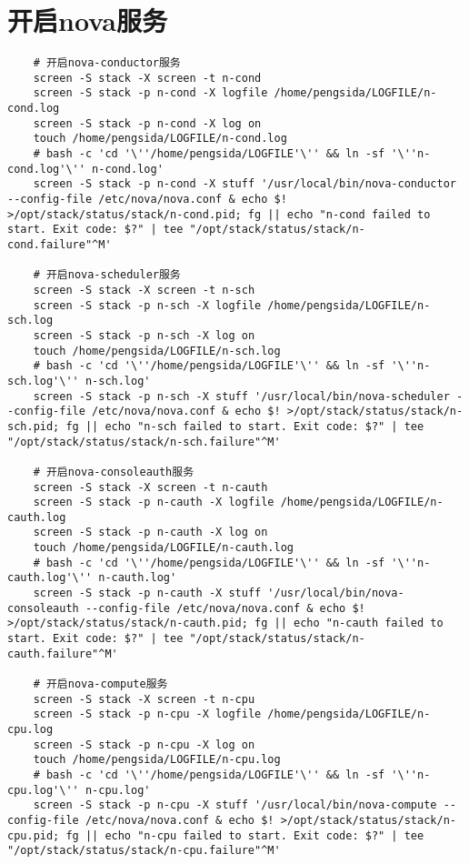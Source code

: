 \documentclass[a4paper,left=1.5cm,right=1.5cm,11pt]{article}
\begin{document}
\section{开启nova服务}
	\begin{lstlisting}
	# 开启nova-conductor服务
	screen -S stack -X screen -t n-cond
	screen -S stack -p n-cond -X logfile /home/pengsida/LOGFILE/n-cond.log
    screen -S stack -p n-cond -X log on
	touch /home/pengsida/LOGFILE/n-cond.log
    # bash -c 'cd '\''/home/pengsida/LOGFILE'\'' && ln -sf '\''n-cond.log'\'' n-cond.log'
	screen -S stack -p n-cond -X stuff '/usr/local/bin/nova-conductor --config-file /etc/nova/nova.conf & echo $! >/opt/stack/status/stack/n-cond.pid; fg || echo "n-cond failed to start. Exit code: $?" | tee "/opt/stack/status/stack/n-cond.failure"^M'

	# 开启nova-scheduler服务
	screen -S stack -X screen -t n-sch
	screen -S stack -p n-sch -X logfile /home/pengsida/LOGFILE/n-sch.log
    screen -S stack -p n-sch -X log on
	touch /home/pengsida/LOGFILE/n-sch.log
    # bash -c 'cd '\''/home/pengsida/LOGFILE'\'' && ln -sf '\''n-sch.log'\'' n-sch.log'
	screen -S stack -p n-sch -X stuff '/usr/local/bin/nova-scheduler --config-file /etc/nova/nova.conf & echo $! >/opt/stack/status/stack/n-sch.pid; fg || echo "n-sch failed to start. Exit code: $?" | tee "/opt/stack/status/stack/n-sch.failure"^M'

	# 开启nova-consoleauth服务
	screen -S stack -X screen -t n-cauth
	screen -S stack -p n-cauth -X logfile /home/pengsida/LOGFILE/n-cauth.log
    screen -S stack -p n-cauth -X log on
	touch /home/pengsida/LOGFILE/n-cauth.log
    # bash -c 'cd '\''/home/pengsida/LOGFILE'\'' && ln -sf '\''n-cauth.log'\'' n-cauth.log'
	screen -S stack -p n-cauth -X stuff '/usr/local/bin/nova-consoleauth --config-file /etc/nova/nova.conf & echo $! >/opt/stack/status/stack/n-cauth.pid; fg || echo "n-cauth failed to start. Exit code: $?" | tee "/opt/stack/status/stack/n-cauth.failure"^M'

	# 开启nova-compute服务
	screen -S stack -X screen -t n-cpu
	screen -S stack -p n-cpu -X logfile /home/pengsida/LOGFILE/n-cpu.log
    screen -S stack -p n-cpu -X log on
	touch /home/pengsida/LOGFILE/n-cpu.log
    # bash -c 'cd '\''/home/pengsida/LOGFILE'\'' && ln -sf '\''n-cpu.log'\'' n-cpu.log'
	screen -S stack -p n-cpu -X stuff '/usr/local/bin/nova-compute --config-file /etc/nova/nova.conf & echo $! >/opt/stack/status/stack/n-cpu.pid; fg || echo "n-cpu failed to start. Exit code: $?" | tee "/opt/stack/status/stack/n-cpu.failure"^M'
	\end{lstlisting}
\end{document}
